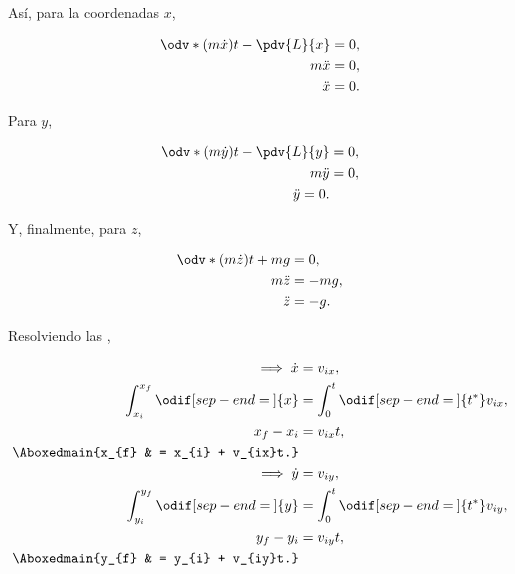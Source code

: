\documentclass[../main.tex]{subfiles}
\begin{document}
\begin{problema}
	Así, para la coordenadas \(x\),

	\begin{align}
		\odv*{(m \dot{x})}{t} - \pdv{L}{x} & = 0,\nonumber           \\
		m \ddot{x}                         & = 0,\nonumber           \\
		\ddot{x}                           & = 0.\label{eq:EOM-x-p2}
	\end{align}

	Para \(y\),

	\begin{align}
		\odv*{(m \dot{y})}{t} - \pdv{L}{y} & = 0,\nonumber \\
		m \ddot{y}                         & = 0,\nonumber \\
		\ddot{y} = 0.\label{eq:EOM-y-p2}
	\end{align}

	Y, finalmente, para \(z\),

	\begin{align}
		\odv*{(m \dot{z})}{t} + mg & = 0,\nonumber            \\
		m \ddot{z}                 & = -mg,\nonumber          \\
		\ddot{z}                   & = -g.\label{eq:EOM-z-p2}
	\end{align}

	Resolviendo las ,

	\begin{align*}
		\Longrightarrow\; \dot{x}                       & = v_{ix},                                             \\
		\int_{x_{i}}^{x_{f}}\odif[sep-end=\medspace]{x} & = \int_{0}^{t}\odif[sep-end=\medspace]{t^{*}} v_{ix}, \\
		x_{f} - x_{i}                                   & = v_{ix}t,                                            \\
		\Aboxedmain{x_{f}                               & = x_{i} + v_{ix}t.}                                   \\
		\Longrightarrow\; \dot{y}                       & = v_{iy},                                             \\
		\int_{y_{i}}^{y_{f}}\odif[sep-end=\medspace]{y} & = \int_{0}^{t}\odif[sep-end=\medspace]{t^{*}} v_{iy}, \\
		y_{f} - y_{i}                                   & = v_{iy}t,                                            \\
		\Aboxedmain{y_{f}                               & = y_{i} + v_{iy}t.}
	\end{align*}


\end{problema}
\end{document}
